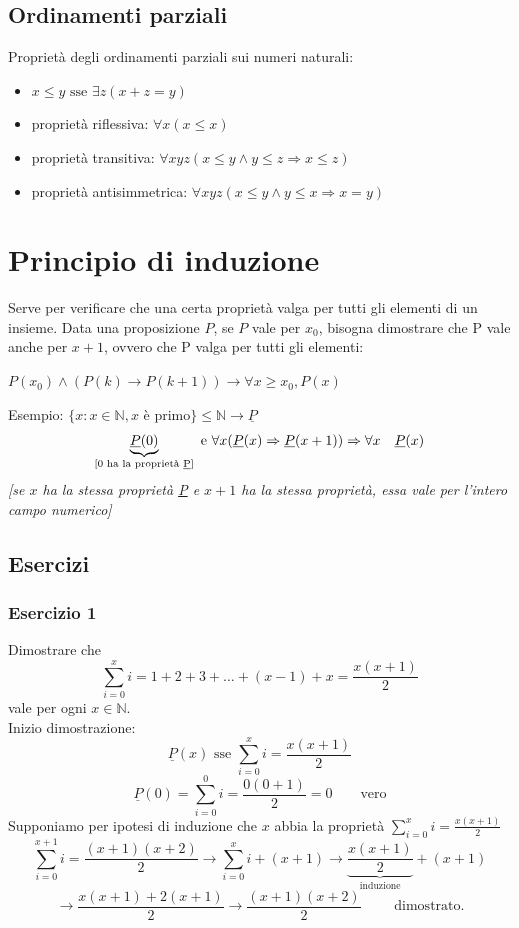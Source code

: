 \documentclass[italian]{article}
\begin{document}
\pagebreak
\subsection{Ordinamenti parziali}
Proprietà degli ordinamenti parziali sui numeri naturali:
\begin{itemize}
	\item $x\leq y \text{ sse } \exists z (x+z=y)$
	\item proprietà riflessiva: $\forall x (x\leq x)$
	\item proprietà transitiva: $\forall xyz (x\leq y \land y\leq z \Rightarrow x\leq z)$
	\item proprietà antisimmetrica: $\forall xyz (x\leq y \land y\leq x \Rightarrow x=y)$
\end{itemize}
\pagebreak
\section{Principio di induzione}
Serve per verificare che una certa proprietà valga per tutti gli elementi di un insieme. Data una proposizione $P$, se $P$ vale per $x_0$, bisogna dimostrare che P vale anche per $x+1$, ovvero che P valga per tutti gli elementi:
\begin{center}
	$P(x_0) \land \left(P(k)\to P(k+1)\right) \to \forall x \geq x_0, P(x)$
\end{center}
Esempio: 
$\{x:x\in \mathbb{N}, x \text{ è primo}\} \leq \mathbb{N} \to \underline{P}$ \\
\[
\underbrace{\underline{P}(0)}_{\text{[0 ha la proprietà \underline{P}]}} \text{ e } \forall x (\underline{P}(x)\Rightarrow\underline{P}(x+1)) \Rightarrow \forall x \quad \underline{P}(x)
\]
\emph{[se $x$ ha la stessa proprietà \underline{P} e $x+1$ ha la stessa proprietà, essa vale per l'intero campo numerico]}
\subsection{Esercizi}
\subsubsection{Esercizio 1}
Dimostrare che
\[
	\sum_{i=0}^{x}i = 1+2+3+\dots + (x-1) + x = \frac{x(x+1)}{2}
\]
vale per ogni $x\in \mathbb{N}$.\\
Inizio dimostrazione:
\[
	\underline{P}(x) \text{ sse } \sum_{i=0}^{x} i=\frac{x(x+1)}{2}
\]
\[
	\underline{P}(0) = \sum_{i=0}^{0}i=\frac{0(0+1)}{2} = 0 \qquad \text{vero}
\]
Supponiamo per ipotesi di induzione che $x$ abbia la proprietà $\sum_{i=0}^{x} i=\frac{x(x+1)}{2}$\\
\[
	\sum_{i=0}^{x+1}i=\frac{(x+1)(x+2)}{2} \to \sum_{i=0}^{x} i + (x+1) \to \underbrace{\frac{x(x+1)}{2}}_{\text{induzione}} + (x+1) 
\]
\[
	\to \frac{x(x+1)+2(x+1)}{2} \to \frac{(x+1)(x+2)}{2} \qquad \text{ dimostrato.}
\]
\pagebreak
\end{document}
